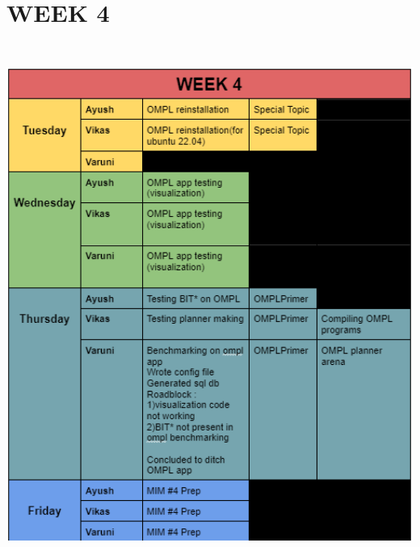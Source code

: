 \documentclass[12pt]{report}
\begin{document}
\section{WEEK 4}
\includegraphics[height=17cm,width = 15cm]{week4.png}


\end{document}
